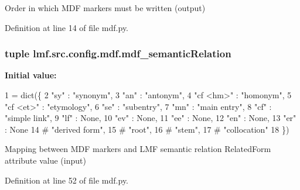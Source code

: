 Order in which M\+D\+F markers must be written (output) 



Definition at line 14 of file mdf.\+py.

\hypertarget{namespacelmf_1_1src_1_1config_1_1mdf_a20455cbc7aa64cc6eb4ad1749a381738}{
\subsubsection[{mdf\+\_\+semantic\+Relation}]{\setlength{\rightskip}{0pt plus 5cm}tuple lmf.\+src.\+config.\+mdf.\+mdf\+\_\+semantic\+Relation}}\label{namespacelmf_1_1src_1_1config_1_1mdf_a20455cbc7aa64cc6eb4ad1749a381738}
{\bfseries Initial value\+:}
\begin{DoxyCode}
1 = dict(\{
2     \textcolor{stringliteral}{"sy"} : \textcolor{stringliteral}{"synonym"},
3     \textcolor{stringliteral}{"an"} : \textcolor{stringliteral}{"antonym"},
4     \textcolor{stringliteral}{"cf <hm>"} : \textcolor{stringliteral}{"homonym"},
5     \textcolor{stringliteral}{"cf <et>"} : \textcolor{stringliteral}{"etymology"},
6     \textcolor{stringliteral}{"se"} : \textcolor{stringliteral}{"subentry"},
7     \textcolor{stringliteral}{"mn"} : \textcolor{stringliteral}{"main entry"},
8     \textcolor{stringliteral}{"cf"} : \textcolor{stringliteral}{"simple link"},
9     \textcolor{stringliteral}{"lf"} : \textcolor{keywordtype}{None},
10     \textcolor{stringliteral}{"ev"} : \textcolor{keywordtype}{None},
11     \textcolor{stringliteral}{"ee"} : \textcolor{keywordtype}{None},
12     \textcolor{stringliteral}{"en"} : \textcolor{keywordtype}{None},
13     \textcolor{stringliteral}{"er"} : \textcolor{keywordtype}{None}
14     \textcolor{comment}{# "derived form",}
15     \textcolor{comment}{# "root",}
16     \textcolor{comment}{# "stem",}
17     \textcolor{comment}{# "collocation"}
18 \})
\end{DoxyCode}


Mapping between M\+D\+F markers and L\+M\+F semantic relation Related\+Form attribute value (input) 



Definition at line 52 of file mdf.\+py.

